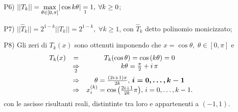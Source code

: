 \begin{property}
\begin{itemize}
\begin{proof}
\begin{equation*}
				\begin{matrix}
					k=0&\Rightarrow& T_0(x) &=& T_0(\cos\theta) &=& \cos{(0\cdot\theta)} &\equiv& 1,\\
					k=1 &\Rightarrow& T_1(x) &=& T_1(\cos\theta) &=& \cos\theta &=& x,
				\end{matrix}
			\end{equation*}
			supposto vero per $k$ e $k-1$ è dimostrato per $k+1$ ciò che segue:
			\begin{equation*}
				\begin{matrix}
					\boldsymbol{T_{k+1}(x)}&\boldsymbol =& 2x\,T_k(x)-T_{k-1}(x) &=& 2cos\theta\cdot\cos{(k\theta)}-\cos{((k-1)\theta)}\\
					&=&2cos\theta\cdot\cos{(k\theta)}-\cos\theta\cdot\cos{(k\theta)}-\sin\theta\sin{(k\theta)} &=& \cos\theta\cdot\cos{(k\theta)}-\sin\theta\cdot\sin{(k\theta)}\\
					&&&=&\boldsymbol{\cos{((k+1)\,\theta)}}
				\end{matrix}
			\end{equation*}
		\end{proof}
		\item[P6)]\footnotemark $||T_k||=\underset{\theta\in [0,\pi]}{\max}|\cos{k\theta}|
		\underset{\footnotemark}{=} 1,\;\forall k\geq 0$;
		\addtocounter{footnote}{-1}
		\item[P7)]$||\widehat T_k||=2^{1-k}||T_k||=2^{1-k},\;\forall k\geq 1$, con $\widehat T_k$ detto polinomio monicizzato;
		\item[P8)] Gli zeri di $T_k(x)$ sono ottenuti imponendo che $x=\cos\theta,\;\theta\in [0,\pi]$ e 
		\begin{equation*}
			\begin{matrix}
				T_k(x)&=&T_k(\cos\theta)=\cos{(k\theta)}=0\\
				&\underset{\footnotemark}{\Rightarrow}& k\theta=\frac{\pi}{2}+i\,\pi\\
				&\Rightarrow&\theta =\frac{(2i+1)\pi}{2k},\, \boldsymbol{i=0,\hdots,k-1}\\
				&\Rightarrow& x_i^{(k)} = \cos{\left(\frac{2i+1}{2k}\pi\right)},\, i=0,\hdots,k-1.
			\end{matrix}
		\end{equation*}
		con le ascisse risultanti reali, distintinte tra loro e appartenenti a $(-1,1)$.
	\end{itemize}
\end{property}

